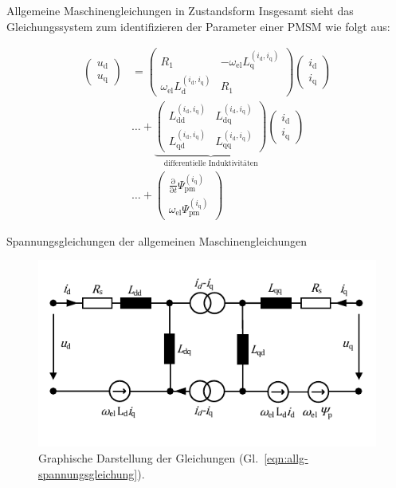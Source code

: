 \documentclass{beamer}
\newcommand{\x}[1]{\mathrm{#1}}
\begin{document}
\begin{frame}{Allgemeine Maschinengleichungen in Zustandsform}
Insgesamt sieht das Gleichungssystem zum identifizieren der Parameter einer PMSM wie folgt aus:

\begin{align}
\left( \begin{array}{c} u_\x{d} \\ u_\x{q} \end{array} \right) &= \left( \begin{array}{cc} R_\x{1} & -\omega_\x{el}L_\x{q}^{(i_\x{d},i_\x{q})} \\ \omega_\x{el}L_\x{d}^{(i_\x{d},i_\x{q})} & R_\x{1} \end{array} \right) \left(\begin{array}{c} i_\x{d} \\ i_\x{q} \end{array}\right) \label{eqn:allg-spannungsgleichung} \\ 
 &\ldots + \underbrace{\left( \begin{array}{cc} L_\x{dd}^{(i_\x{d},i_\x{q})} & L_\x{dq}^{(i_\x{d},i_\x{q})} \\ L_\x{qd}^{(i_\x{d},i_\x{q})} & L_\x{qq}^{(i_\x{d},i_\x{q})} \end{array}\right)}_{\text{differentielle Induktivitäten}} \left(\begin{array}{c} i_\x{d} \\ i_\x{q} \end{array} \right) \nonumber \\ 
& \ldots + \left( \begin{array}{c} \frac{\x{\partial}}{\x{\partial }t} \Psi_\x{pm}^{(i_\x{q})} \\ \omega_\x{el} \Psi_\x{pm}^{(i_\x{q})} \nonumber \end{array}  \right) \nonumber
\end{align}
\end{frame}

\begin{frame}[plain]{Spannungsgleichungen der allgemeinen Maschinengleichungen}
\begin{figure}[!h]
\centering
\includegraphics[width=\textwidth]{img/allg-spannungsgleichung}
\caption{Graphische Darstellung der Gleichungen (Gl.~\ref{eqn:allg-spannungsgleichung}).}
\label{fig:allg-spannungsgleichung}
\end{figure}
\end{frame}
\end{document}

